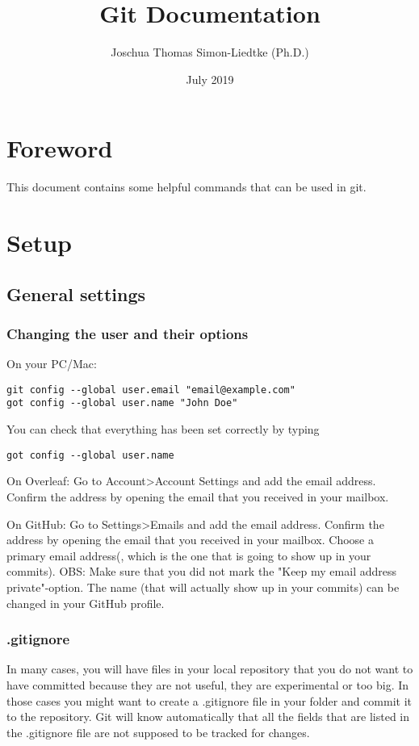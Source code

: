 \documentclass{report}
\title{Git Documentation}
\author{Joschua Thomas Simon-Liedtke (Ph.D.)}
\date{July 2019}
\begin{document}
\maketitle

\chapter*{Foreword}

This document contains some helpful commands that can be used in git.

\tableofcontents

\chapter{Setup}

\section{General settings}

\subsection{Changing the user and their options}

On your PC/Mac:
\begin{verbatim}
git config --global user.email "email@example.com"
got config --global user.name "John Doe"
\end{verbatim}
You can check that everything has been set correctly by typing
\begin{verbatim}
got config --global user.name
\end{verbatim}

On Overleaf:
Go to Account{\textgreater}Account Settings and add the email address. Confirm the address by opening the email that you received in your mailbox.

On GitHub:
Go to Settings\textgreater  Emails and add the email address. Confirm the address by opening the email that you received in your mailbox. Choose a primary email address(, which is the one that is going to show up in your commits). OBS: Make sure that you did not mark the "Keep my email address private"-option. The name (that will actually show up in your commits) can be changed in your GitHub profile.

\subsection{.gitignore}
In many cases, you will have files in your local repository that you do not want to have committed because they are not useful, they are experimental or too big. In those cases you might want to create a .gitignore file in your folder and commit it to the repository. Git will know automatically that all the fields that are listed in the .gitignore file are not supposed to be tracked for changes.
\end{document}
